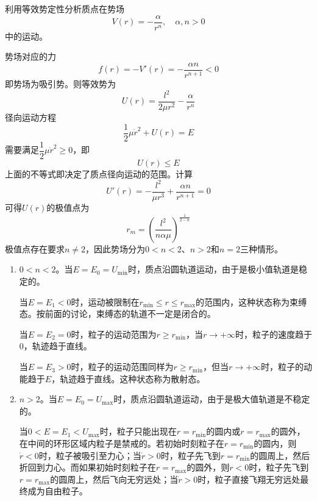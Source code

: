\begin{example}
利用等效势定性分析质点在势场
\begin{equation*}
	V(r) = -\frac{\alpha}{r^n},\quad \alpha,n > 0
\end{equation*}
中的运动。
\end{example}
\begin{solution}
势场对应的力
\begin{equation*}
	f(r) = -V'(r) = -\frac{\alpha n}{r^{n+1}}<0
\end{equation*}
即势场为吸引势。则等效势为
\begin{equation*}
	U(r) = \frac{l^2}{2\mu r^2} - \frac{\alpha}{r^n}
\end{equation*}
径向运动方程
\begin{equation*}
	\frac12 \mu \dot{r}^2 + U(r) = E
\end{equation*}
需要满足$\dfrac12 \mu \dot{r}^2 \geqslant 0$，即
\begin{equation*}
	U(r) \leqslant E
\end{equation*}
上面的不等式即决定了质点径向运动的范围。计算
\begin{equation*}
	U'(r) = -\frac{l^2}{\mu r^3} + \frac{\alpha n}{r^{n+1}} = 0
\end{equation*}
可得$U(r)$的极值点为
\begin{equation*}
	r_m = \left(\frac{l^2}{n\alpha \mu}\right)^{\frac{1}{2-n}}
\end{equation*}
极值点存在要求$n \neq 2$，因此势场分为$0<n<2$、$n>2$和$n=2$三种情形。
\begin{enumerate}
	\item $0<n<2$。当$E=E_0=U_{\mathrm{min}}$时，质点沿圆轨道运动，由于是极小值轨道是稳定的。
	
	当$E=E_1<0$时，运动被限制在$r_{\mathrm{min}} \leqslant r \leqslant r_{\mathrm{max}}$的范围内，这种状态称为束缚态。按前面的讨论，束缚态的轨道不一定是闭合的。
	
	当$E=E_2=0$时，粒子的运动范围为$r \geqslant r_{\mathrm{min}}$，当$r \to +\infty$时，粒子的速度趋于$0$，轨迹趋于直线。
	
	当$E=E_3>0$时，粒子的运动范围同样为$r \geqslant r_{\mathrm{min}}$，但当$r \to +\infty$时，粒子的动能趋于$E$，轨迹趋于直线。这种状态称为散射态。

	\item $n>2$。当$E=E_0=U_{\mathrm{max}}$时，质点沿圆轨道运动，由于是极大值轨道是不稳定的。
	
	当$0<E=E_1<U_{\mathrm{max}}$时，粒子只能出现在$r = r_{\mathrm{min}}$的圆内或$r = r_{\mathrm{max}}$的圆外，在中间的环形区域内粒子是禁戒的。若初始时刻粒子在$r = r_{\mathrm{min}}$的圆内，则$\dot{r} < 0$时，粒子被吸引至力心；当$\dot{r}>0$时，粒子先飞到$r = r_{\mathrm{min}}$的圆周上，然后折回到力心。而如果初始时刻粒子在$r = r_{\mathrm{max}}$的圆外，则$\dot{r} < 0$时，粒子先飞到$r = r_{\mathrm{max}}$的圆周上，然后飞向无穷远处；当$\dot{r}>0$时，粒子直接飞翔无穷远处最终成为自由粒子。
	

\end{enumerate}
\end{solution}
